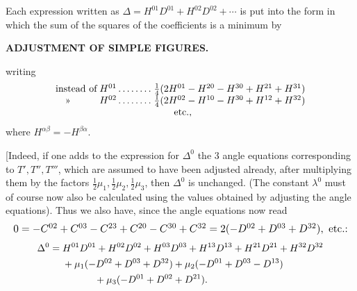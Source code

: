 Each expression written as \(\Delta=H^{01}D^{01}+H^{02}D^{02}+\cdots\) is put into the form in which the sum of the squares of the coefficients is a minimum by

\par\clearpage
\noindent\null\hfill{\small\textbf{ADJUSTMENT OF SIMPLE FIGURES.}}\hfill{}\par\medskip

\noindent writing
\[
\begin{array}{@{}l@{\;}l@{\;}l@{}}
 \text{instead of}&
 H^{01}\,.\,.\,.\,.\,.\,.\,.\,.&
 \tfrac14(2H^{01}-H^{20}-H^{30}+H^{21}+H^{31})\\
 \text{\quad»}&
 H^{02}\,.\,.\,.\,.\,.\,.\,.\,.&
 \tfrac14(2H^{02}-H^{10}-H^{30}+H^{12}+H^{32})\\
 \multicolumn{3}{c@{}}{\text{etc.,}}
\end{array}
\]
\noindent where \(H^{\alpha\beta}=-H^{\beta\alpha}\).

[Indeed, if one adds to the expression for \(\Delta^0\) the 3 angle equations corresponding to \(T',T'',T'''\), which are assumed to have been adjusted already, after multiplying them by the factors \(\tfrac12\mu_1,\tfrac12\mu_2,\tfrac12\mu_3\), then \(\Delta^0\) is unchanged. (The constant \(\lambda^0\) must of course now also be calculated using the values obtained by adjusting the angle equations). Thus we also have, since the angle equations now read
\[
 \resizebox{\linewidth}{!}{\(0=-C^{02}+C^{03}-C^{23}+C^{20}-C^{30}+C^{32}
 =2(-D^{02}+D^{03}+D^{32}),\ \text{etc.:}\)}
\]
\[
\begin{aligned}
 \Delta^0={}&H^{01}D^{01}+H^{02}D^{02}+H^{03}D^{03}
             +H^{13}D^{13}+H^{21}D^{21}+H^{32}D^{32}\\
 &+\mu_1(-D^{02}+D^{03}+D^{32})+\mu_2(-D^{01}+D^{03}-D^{13})\\
 &\hspace{3.3em}+\mu_3(-D^{01}+D^{02}+D^{21}).
\end{aligned}
\]

